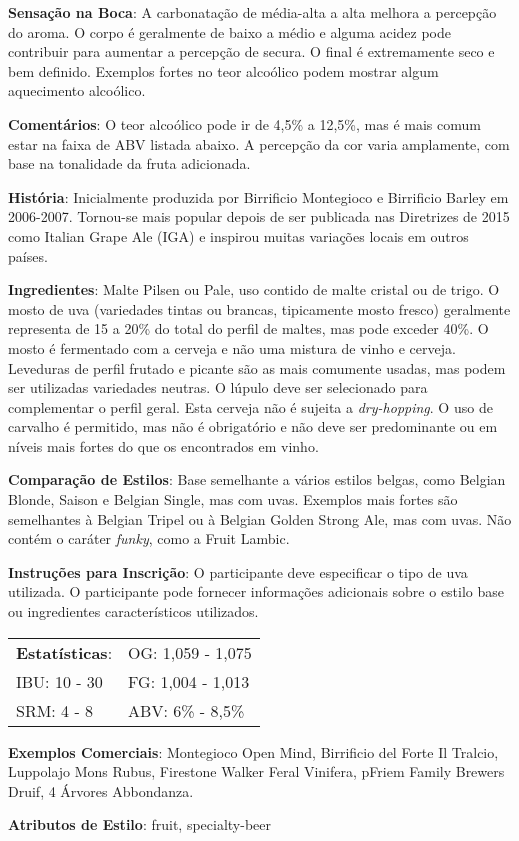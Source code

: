 \textbf{Sensação na Boca}: A carbonatação de média-alta a alta melhora a percepção do aroma. O corpo é geralmente de baixo a médio e alguma acidez pode contribuir para aumentar a percepção de secura. O final é extremamente seco e bem definido. Exemplos fortes no teor alcoólico podem mostrar algum aquecimento alcoólico.

\textbf{Comentários}: O teor alcoólico pode ir de 4,5\% a 12,5\%, mas é mais comum estar na faixa de ABV listada abaixo. A percepção da cor varia amplamente, com base na tonalidade da fruta adicionada.

\textbf{História}: Inicialmente produzida por Birrificio Montegioco e Birrificio Barley em 2006-2007. Tornou-se mais popular depois de ser publicada nas Diretrizes de 2015 como Italian Grape Ale (IGA) e inspirou muitas variações locais em outros países.

\textbf{Ingredientes}: Malte Pilsen ou Pale, uso contido de malte cristal ou de trigo. O mosto de uva (variedades tintas ou brancas, tipicamente mosto fresco) geralmente representa de 15 a 20\% do total do perfil de maltes, mas pode exceder 40\%. O mosto é fermentado com a cerveja e não uma mistura de vinho e cerveja. Leveduras de perfil frutado e picante são as mais comumente usadas, mas podem ser utilizadas variedades neutras. O lúpulo deve ser selecionado para complementar o perfil geral. Esta cerveja não é sujeita a \textit{dry-hopping}. O uso de carvalho é permitido, mas não é obrigatório e não deve ser predominante ou em níveis mais fortes do que os encontrados em vinho.

\textbf{Comparação de Estilos}: Base semelhante a vários estilos belgas, como Belgian Blonde, Saison e Belgian Single, mas com uvas. Exemplos mais fortes são semelhantes à Belgian Tripel ou à Belgian Golden Strong Ale, mas com uvas. Não contém o caráter \textit{funky}, como a Fruit Lambic.

\textbf{Instruções para Inscrição}: O participante deve especificar o tipo de uva utilizada. O participante pode fornecer informações adicionais sobre o estilo base ou ingredientes característicos utilizados.

\begin{tabular}{@{}p{35mm}p{35mm}@{}}
  \textbf{Estatísticas}: & OG: 1,059 - 1,075 \\
  IBU: 10 - 30  & FG: 1,004 - 1,013  \\
  SRM: 4 - 8  & ABV: 6\% - 8,5\%
\end{tabular}

\textbf{Exemplos Comerciais}: Montegioco Open Mind, Birrificio del Forte Il Tralcio, Luppolajo Mons Rubus, Firestone Walker Feral Vinifera, pFriem Family Brewers Druif, 4 Árvores Abbondanza.

\textbf{Atributos de Estilo}: fruit, specialty-beer
